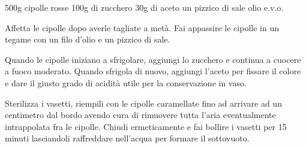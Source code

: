 \begin{ingreds}
	500g cipolle rosse
	100g di zucchero
	30g di aceto
	un pizzico di sale
	olio e.v.o. 

\end{ingreds}

\begin{method}
Affetta le cipolle dopo averle tagliate a metà. Fai appassire le cipolle in un tegame con un filo d'olio e un pizzico di sale.

Quando le cipolle iniziano a sfrigolare, aggiungi lo zucchero e continua a cuocere a fuoco moderato. Quando sfrigola di nuovo, aggiungi l'aceto per fissare il colore e dare il giusto grado di acidità utile per la conservazione in vaso.

Sterilizza i vasetti, riempili con le cipolle caramellate fino ad arrivare ad un centimetro dal bordo avendo cura di rimuovere tutta l'aria eventualmente intrappolata fra le cipolle. Chiudi ermeticamente e fai bollire i vasetti per 15 minuti lasciandoli raffreddare nell'acqua per formare il sottovuoto.



\end{method}



